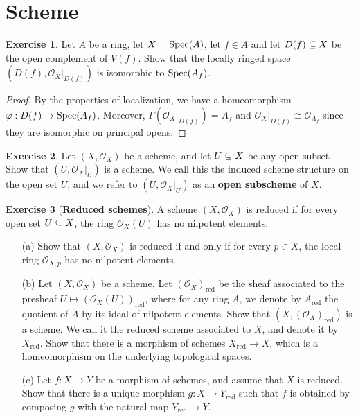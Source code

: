 \documentclass[11pt]{book}
\theoremstyle{definition}
\newtheorem{exercise}{Exercise}[section]
\begin{document}
\section{Scheme}
\begin{exercise}
Let $A$ be a ring, let $X=\mathrm{Spec}(A)$, let $f\in A$ and let $D(f)\subseteq X$ be the open complement of $V(f)$. Show that the locally ringed space $(D(f),\mathscr{O}_X|_{D(f)})$ is isomorphic to $\mathrm{Spec}(A_f)$.
\end{exercise}
\begin{proof}
By the properties of localization, we have a homeomorphism $\varphi:D(f)\to\mathrm{Spec}(A_f)$. Moreover, $\Gamma(\mathscr{O}_X|_{D(f)})=A_f$ and $\mathscr{O}_X|_{D(f)}\cong\mathscr{O}_{A_f}$ since they are isomorphic on principal opens.
\end{proof}
\begin{exercise}
Let $(X,\mathscr{O}_X)$ be a scheme, and let $U\subseteq X$ be any open subset. Show that $(U,\mathscr{O}_X|_U)$ is a scheme. We call this the induced scheme structure on the open set $U$, and we refer to $(U,\mathscr{O}_X|_{U})$ as an \textbf{open subscheme} of $X$.
\end{exercise}
\begin{exercise}[\textbf{Reduced schemes}]
A scheme $(X,\mathscr{O}_X)$ is reduced if for every open set $U\subseteq X$, the ring $\mathscr{O}_X(U)$ has no nilpotent elements.
\begin{itemize}
\item[(a)] Show that $(X,\mathscr{O}_X)$ is reduced if and only if for every $p\in X$, the local ring $\mathscr{O}_{X,p}$ has no nilpotent elements.
\item[(b)] Let $(X,\mathscr{O}_X)$ be a scheme. Let $(\mathscr{O}_X)_{\text{red}}$ be the sheaf associated to the presheaf $U\mapsto(\mathscr{O}_X(U))_{\text{red}}$, where for any ring $A$, we denote by $A_{\text{red}}$ the quotient of $A$ by its ideal of nilpotent elements. Show that $(X,(\mathscr{O}_{X})_{\text{red}})$ is a scheme. We call it the reduced scheme associated to $X$, and denote it by $X_{\text{red}}$. Show that there is a morphism of schemes $X_{\text{red}}\to X$, which is a homeomorphism on the underlying topological spaces.
\item[(c)] Let $f:X\to Y$ be a morphism of schemes, and assume that $X$ is reduced. Show that there is a unique morphism $g:X\to Y_{\text{red}}$ such that $f$ is obtained by composing $g$ with the natural map $Y_{\text{red}}\to Y$. 
\end{itemize}
\end{exercise}
\end{document}
